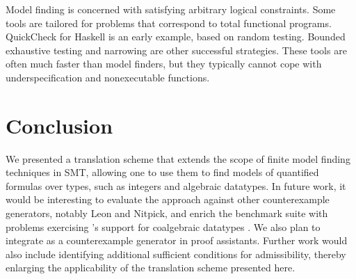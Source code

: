 Model finding is concerned with satisfying arbitrary logical constraints. Some
tools are tailored for problems that correspond to total functional
programs. QuickCheck \cite{claessen-hughes-2000} for Haskell is an
early example, based on random testing. Bounded exhaustive testing
\cite{runciman-et-al-2008} and narrowing
\cite{lindblad-2008-testing} are other successful strategies. These
tools are often much faster than model finders, but they typically cannot cope
with underspecification and nonexecutable functions.




%
%
%

\section{Conclusion}
\label{sec:conclusion}

We presented a translation scheme that extends the scope of finite model finding 
techniques in SMT, allowing one to use them to find models of quantified formulas 
over  types, such as integers and algebraic datatypes.
%
In future work, it would be interesting to evaluate the approach against other
counterexample generators, notably Leon and Nitpick, and enrich the benchmark
suite with problems exercising \cvc's support for coalgebraic datatypes
\cite{reynolds-blanchette-2015-codata}. We also plan to integrate \cvc as a
counterexample generator in proof assistants. Further work would also
include identifying additional sufficient conditions for admissibility, thereby
enlarging the applicability of the translation scheme presented here.

